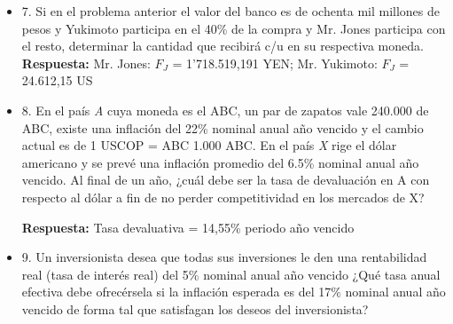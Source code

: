 \begin{itemize}
       Inflación en: Colombia, 18\% nominal anual año vencido, en Estados Unidos, 3.5\% nominal anual año vencido, en Japón, 2.3\%  nominal anual año vencido  \\
       Tasa de devaluación del peso frente al dólar 22\% nominal anual año vencido  \\
       Tasa de devaluación del dólar frente al Yen 1\% nominal anual año vencido  \\
       Cambio actual 1 USCOP = 2.000 COP; 1 USCOP = 105 YEN\\
       \textbf{Respuesta:} a. Mr. Jones: i = 10,58\% nominal anual año vencido y $i_{R}$ = 6,86\% nominal anual año vencido; Mr. Yukimoto: i = 9,49\% nominal anual año vencido y $i_{R}$ = 0,03\% nominal anual año vencido  \\
       b. $F_{yen}$ = \$241,626 YEN y $F_{USD}$ = 2,307 USD\\
      \medskip

 \item 7. Si en el problema anterior el valor del banco es de ochenta mil millones de pesos y Yukimoto  participa en el 40\% de la compra y Mr. Jones participa con el resto, determinar la cantidad que  recibirá c/u en su respectiva moneda.\\
      \textbf{Respuesta:} Mr. Jones: $F_{J}$ = 1'718.519,191 YEN; Mr. Yukimoto: $F_{J}$ = 24.612,15 US\\
      \medskip

 \item 8. En el país \textit{A} cuya moneda es el ABC, un par de zapatos vale 240.000 de ABC, existe una inflación  del 22\% nominal anual año vencido y el cambio actual es de 1 USCOP = ABC 1.000 ABC. En el país \textit{X} rige el dólar americano y se prevé  una inflación promedio del 6.5\% nominal anual año vencido. Al final de un año, ¿cuál debe ser la tasa de devaluación en A con respecto al dólar a fin de no perder competitividad en los mercados de X?
 
      \textbf{Respuesta:} Tasa devaluativa = 14,55\% periodo año vencido \\
       \medskip

 \item 9. Un inversionista desea que todas sus inversiones le den una rentabilidad real (tasa de interés real) del 5\% nominal anual año vencido ¿Qué  tasa anual efectiva debe ofrecérsela si la inflación esperada es del 17\% nominal anual año vencido de forma tal que satisfagan  los deseos del inversionista?
 

\end{itemize}
